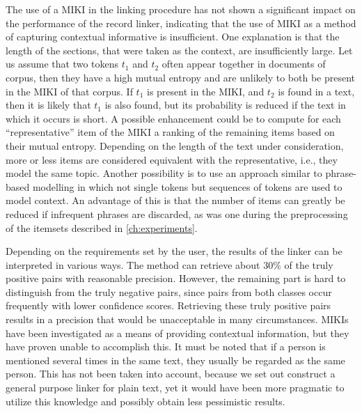 The use of a MIKI in the linking procedure has not shown a significant impact on the performance of the record linker, indicating that the use of MIKI as a method of capturing contextual informative is insufficient.
One explanation is that the length of the sections, that were taken as the context, are insufficiently large.
Let us assume that two tokens $t_1$ and $t_2$ often appear together in documents of corpus, then they have a high mutual entropy and are unlikely to both be present in the MIKI of that corpus.
If $t_1$ is present in the MIKI, and $t_2$ is found in a text, then it is likely that $t_1$ is also found, but its probability is reduced if the text in which it occurs is short.
A possible enhancement could be to compute for each ``representative'' item of the MIKI a ranking of the remaining items based on their mutual entropy.
Depending on the length of the text under consideration, more or less items are considered equivalent with the representative, i.e., they model the same topic.
Another possibility is to use an approach similar to phrase-based modelling \citep{Lin2009} in which not single tokens but sequences of tokens are used to model context.
An advantage of this is that the number of items can greatly be reduced if infrequent phrases are discarded, as was one during the preprocessing of the itemsets described in \cref{ch:experiments}.

Depending on the requirements set by the user, the results of the linker can be interpreted in various ways.
The method can retrieve about $30\%$ of the truly positive pairs with reasonable precision.
However, the remaining part is hard to distinguish from the truly negative pairs, since pairs from both classes occur frequently with lower confidence scores.
Retrieving these truly positive pairs results in a precision that would be unacceptable in many circumstances.
MIKIs have been investigated as a means of providing contextual information, but they have proven unable to accomplish this.
It must be noted that if a person is mentioned several times in the same text, they usually be regarded as the same person.
This has not been taken into account, because we set out construct a general purpose linker for plain text, yet it would have been more pragmatic to utilize this knowledge and possibly obtain less pessimistic results.

